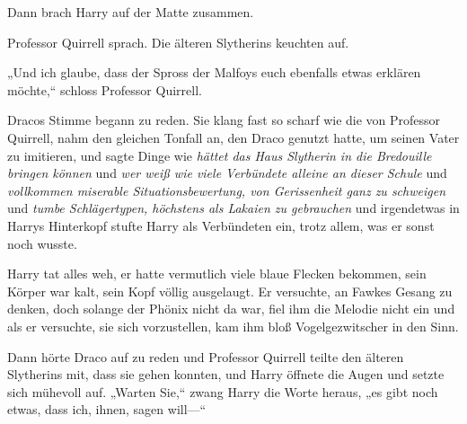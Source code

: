 Dann brach Harry auf der Matte zusammen.

Professor Quirrell sprach. Die älteren Slytherins keuchten auf.

„Und ich glaube, dass der Spross der Malfoys euch ebenfalls etwas erklären möchte,“ schloss Professor Quirrell.

Dracos Stimme begann zu reden. Sie klang fast so scharf wie die von Professor Quirrell, nahm den gleichen Tonfall an, den Draco genutzt hatte, um seinen Vater zu imitieren, und sagte Dinge wie \emph{hättet das Haus Slytherin in die Bredouille bringen können} und \emph{wer weiß wie viele Verbündete alleine an dieser Schule} und \emph{vollkommen miserable Situationsbewertung, von Gerissenheit ganz zu schweigen} und \emph{tumbe Schlägertypen, höchstens als Lakaien zu gebrauchen} und irgendetwas in Harrys Hinterkopf stufte Harry als Verbündeten ein, trotz allem, was er sonst noch wusste.

Harry tat alles weh, er hatte vermutlich viele blaue Flecken bekommen, sein Körper war kalt, sein Kopf völlig ausgelaugt. Er versuchte, an Fawkes Gesang zu denken, doch solange der Phönix nicht da war, fiel ihm die Melodie nicht ein und als er versuchte, sie sich vorzustellen, kam ihm bloß Vogelgezwitscher in den Sinn.

Dann hörte Draco auf zu reden und Professor Quirrell teilte den älteren Slytherins mit, dass sie gehen konnten, und Harry öffnete die Augen und setzte sich mühevoll auf. „Warten Sie,“ zwang Harry die Worte heraus, „es gibt noch etwas, dass ich, ihnen, sagen will—“

